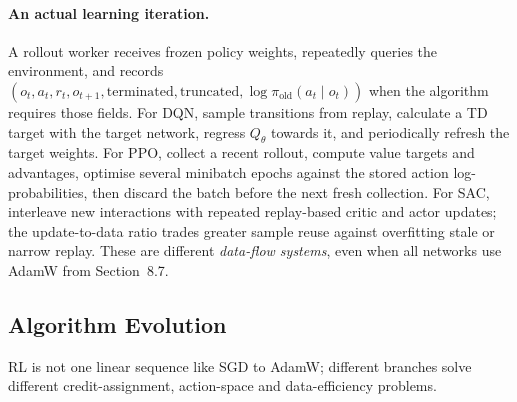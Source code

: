\paragraph{An actual learning iteration.}
A rollout worker receives frozen policy weights, repeatedly queries the environment, and records $(o_t,a_t,r_t,o_{t+1},\mathrm{terminated},\mathrm{truncated},\log\pi_{\mathrm{old}}(a_t\mid o_t))$ when the algorithm requires those fields.
For DQN, sample transitions from replay, calculate a TD target with the target network, regress $Q_{\theta}$ towards it, and periodically refresh the target weights.
For PPO, collect a recent rollout, compute value targets and advantages, optimise several minibatch epochs against the stored action log-probabilities, then discard the batch before the next fresh collection.
For SAC, interleave new interactions with repeated replay-based critic and actor updates; the update-to-data ratio trades greater sample reuse against overfitting stale or narrow replay.
These are different \emph{data-flow systems}, even when all networks use AdamW from Section~8.7.

\subsection{Algorithm Evolution}\label{sec:rl-evolution}
RL is not one linear sequence like SGD to AdamW; different branches solve different credit-assignment, action-space and data-efficiency problems.

